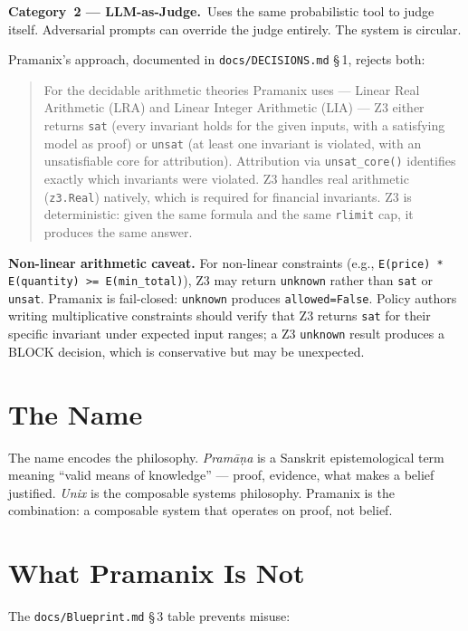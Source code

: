 \documentclass[12pt,a4paper,oneside]{report}
\newcommand{\fname}[1]{\texttt{#1}}          %
\newcommand{\code}[1]{\texttt{#1}}           %
\newcommand{\cfrsec}[1]{\S\,#1}             %
\begin{document}
\textbf{Category~2 --- LLM-as-Judge.}\ Uses the same probabilistic tool to
judge itself. Adversarial prompts can override the judge entirely. The system
is circular.

Pramanix's approach, documented in \fname{docs/DECISIONS.md} \cfrsec{1},
rejects both:

\begin{quote}
For the decidable arithmetic theories Pramanix uses --- Linear Real
Arithmetic (LRA) and Linear Integer Arithmetic (LIA) --- Z3 either returns
\code{sat} (every invariant holds for the given inputs, with a satisfying
model as proof) or \code{unsat} (at least one invariant is violated, with an
unsatisfiable core for attribution).  Attribution via \code{unsat\_core()}
identifies exactly which invariants were violated.  Z3 handles real
arithmetic (\code{z3.Real}) natively, which is required for financial
invariants.  Z3 is deterministic: given the same formula and the same
\code{rlimit} cap, it produces the same answer.
\end{quote}

\textbf{Non-linear arithmetic caveat.}  For non-linear constraints (e.g.,
\code{E(price) * E(quantity) >= E(min\_total)}), Z3 may return \code{unknown}
rather than \code{sat} or \code{unsat}.  Pramanix is fail-closed:
\code{unknown} produces \code{allowed=False}.  Policy authors writing
multiplicative constraints should verify that Z3 returns \code{sat} for their
specific invariant under expected input ranges; a Z3 \code{unknown} result
produces a BLOCK decision, which is conservative but may be unexpected.

\section{The Name}

The name encodes the philosophy. \textit{Pram\={a}\d{n}a} is a Sanskrit
epistemological term meaning ``valid means of knowledge'' --- proof, evidence,
what makes a belief justified. \textit{Unix} is the composable systems
philosophy. Pramanix is the combination: a composable system that operates on
proof, not belief.

\section{What Pramanix Is Not}

The \fname{docs/Blueprint.md} \cfrsec{3} table prevents misuse:
\end{document}
